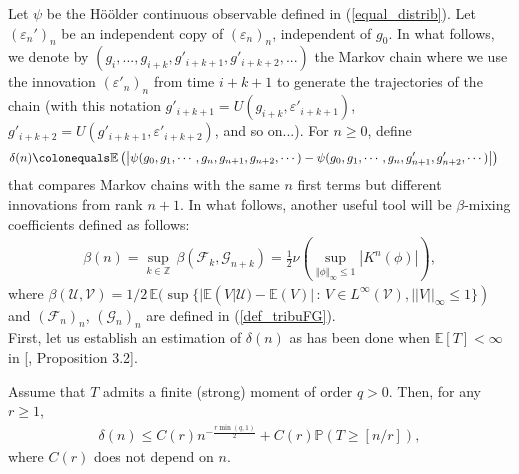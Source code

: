 \documentclass{ws-sd}
\newcommand{\E}{\mathbb{E}}
\newcommand{\Proba}{\mathbb{P}}
\newcommand{\Z}{\mathbb{Z}}
\newcommand{\calF}{\mathcal{F}}
\newcommand{\norm}[1]{\left\Vert #1\right\Vert}
\newcommand{\abs}[1]{\left\lvert #1 \right\rvert}
\newcommand{\eqdef}{\colonequals}
\newcommand\bigp[1]{\left(#1\right)}
\newcommand{\eps}{\varepsilon}
\begin{document}
\noindent
Let $\psi$ be the H\"oölder continuous observable defined in (\ref{equal_distrib}).
Let $(\eps_n')_n$ be an independent copy of $(\eps_n)_n$, independent of $g_0$.
In what follows, we denote  by $(g_i, ..., g_{i+k}, g'_{i+k+1}, g'_{i+k+2}, ...)$ the Markov chain where we use the innovation $(\varepsilon'_n)_n$ from time $i+k+1$ to generate the trajectories of the chain (with this notation $g'_{i+k+1}=U(g_{i+k}, \varepsilon'_{i+k+1})$, $g'_{i+k+2}= U(g'_{i+k+1}, \varepsilon'_{i+k+2})$, and so on...).
For $n \ge 0$, define
\begin{align*}
    &\delta(n) \eqdef \E\left( \abs{
        \psi(g_0, g_1, \cdots, g_n, g_{n+1}, g_{n+2}, \cdots) - \psi(g_0, g_1, \cdots, g_n, g_{n+1}', g_{n+2}', \cdots)
    }\right)
\end{align*}
that compares Markov chains with the same $n$ first terms but different innovations from rank $n+1$.
In what follows, another useful tool will be $\beta$-mixing coefficients defined as follows:
\begin{align*}
    \beta(n) = \underset{k \in \Z}{\sup} \,  \beta(\calF_k, \mathcal G_{n + k}) = \frac 1 2 \nu \bigp{\underset{\norm{\phi}_\infty \le 1}{\sup}\abs{K^n(\phi)}},
\end{align*}
where
    $\beta({\mathcal U}, {\mathcal V})= 1/2 \, \E(\sup\{ |\E(V|{\mathcal U})-\E(V)| \, : \, V \in L^{\infty}({\mathcal V}), ||V||_{\infty} \le 1\})
    $
and $(\calF_n)_n$, $(\mathcal G _n)_n$ are defined in (\ref{def_tribuFG}).
\\
First, let us establish an estimation of $\delta(n)$ as has been done when $\E[T] < \infty$ in [, Proposition 3.2].
\begin{lemma}\label{control_delta}
Assume that $T$ admits a finite (strong) moment of order $q > 0$. Then, for any $r \ge 1$,
        \begin{align*}
            \delta(n) \le C(r)n^{-\frac{r\min(q,1)}{2}} + C(r)\Proba(T \ge [n/r]),
        \end{align*}
    where $C(r)$ does not depend on $n$.
\end{lemma}
\end{document}
